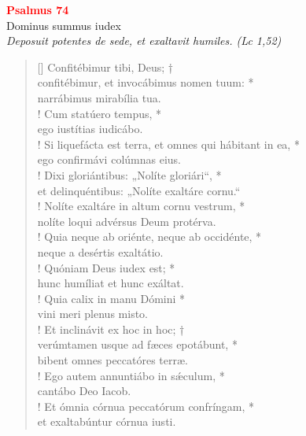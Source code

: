 


\def\greinitialformat#1{%
{\fontsize{39}{39}\selectfont #1}%
}




\vspace{0.3cm}
\begin{center}
 \textcolor{red}{\large \bf Psalmus 74}\\
Dominus summus iudex\\
\textit{\small Deposuit potentes de sede, et exaltavit humiles. (Lc 1,52)}
\end{center}
\begin{verse}[\versewidth]
Confitébimur tibi, Deus; †\\
confitébimur, et invocábimus nomen tuum: *\\
narrábimus mirabília tua.\\!
\vin Cum statúero tempus, *\\
\vin ego iustítias iudicábo.\\!
Si liquefácta est terra, et omnes qui hábitant in ea, *\\
ego confirmávi colúmnas eius.\\!
\vin Dixi gloriántibus: „Nolíte gloriári“, *\\
\vin et delinquéntibus: „Nolíte exaltáre cornu.“\\!
Nolíte exaltáre in altum cornu vestrum, *\\
nolíte loqui advérsus Deum protérva.\\!
\vin Quia neque ab oriénte, neque ab occidénte, *\\
\vin neque a desértis exaltátio.\\!
Quóniam Deus iudex est; *\\
hunc humíliat et hunc exáltat.\\!
\vin Quia calix in manu Dómini *\\
\vin vini meri plenus misto.\\!
Et inclinávit ex hoc in hoc; †\\
verúmtamen usque ad fæces epotábunt, *\\
bibent omnes peccatóres terræ.\\!
\vin Ego autem annuntiábo in s\'{æ}culum, *\\
\vin cantábo Deo Iacob.\\!
Et ómnia córnua peccatórum confríngam, *\\
et exaltabúntur córnua iusti.\\
\end{verse}
\vspace{1cm}


